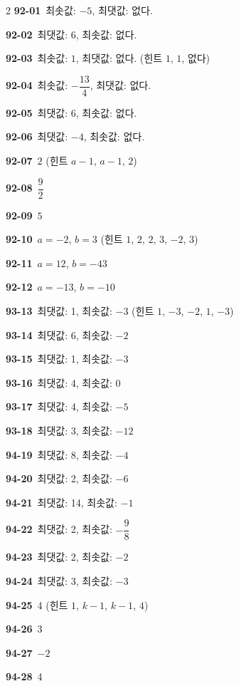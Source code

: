 \documentclass[10pt,a4paper]{article}
\begin{document}
\begin{multicols}{2}
\noindent\textbf{92-01}\ 최솟값: $-5$, 최댓값: 없다.\par
\noindent\textbf{92-02}\ 최댓값: $6$, 최솟값: 없다.\par
\noindent\textbf{92-03}\ 최솟값: $1$, 최댓값: 없다. (힌트 $1$, $1$, 없다)\par
\noindent\textbf{92-04}\ 최솟값: $-\dfrac{13}{4}$, 최댓값: 없다.\par
\noindent\textbf{92-05}\ 최댓값: $6$, 최솟값: 없다.\par
\noindent\textbf{92-06}\ 최댓값: $-4$, 최솟값: 없다.\par
\noindent\textbf{92-07}\ $2$ (힌트 $a-1$, $a-1$, $2$)\par
\noindent\textbf{92-08}\ $\dfrac{9}{2}$\par
\noindent\textbf{92-09}\ $5$\par
\noindent\textbf{92-10}\ $a=-2$, $b=3$ (힌트 $1$, $2$, $2$, $3$, $-2$, $3$)\par
\noindent\textbf{92-11}\ $a=12$, $b=-43$\par
\noindent\textbf{92-12}\ $a=-13$, $b=-10$\par
\noindent\textbf{93-13}\ 최댓값: 1, 최솟값: $-3$ (힌트 $1$, $-3$, $-2$, $1$, $-3$)\par
\noindent\textbf{93-14}\ 최댓값: 6, 최솟값: $-2$\par
\noindent\textbf{93-15}\ 최댓값: 1, 최솟값: $-3$\par
\noindent\textbf{93-16}\ 최댓값: 4, 최솟값: 0\par
\noindent\textbf{93-17}\ 최댓값: 4, 최솟값: $-5$\par
\noindent\textbf{93-18}\ 최댓값: 3, 최솟값: $-12$\par
\noindent\textbf{94-19}\ 최댓값: 8, 최솟값: $-4$\par
\noindent\textbf{94-20}\ 최댓값: 2, 최솟값: $-6$\par
\noindent\textbf{94-21}\ 최댓값: 14, 최솟값: $-1$\par
\noindent\textbf{94-22}\ 최댓값: 2, 최솟값: $-\dfrac{9}{8}$\par
\noindent\textbf{94-23}\ 최댓값: 2, 최솟값: $-2$\par
\noindent\textbf{94-24}\ 최댓값: 3, 최솟값: $-3$\par
\noindent\textbf{94-25}\ 4 (힌트 $1$, $k-1$, $k-1$, $4$)\par
\noindent\textbf{94-26}\ 3\par
\noindent\textbf{94-27}\ $-2$\par
\noindent\textbf{94-28}\ 4\par

\end{multicols}
\end{document}
